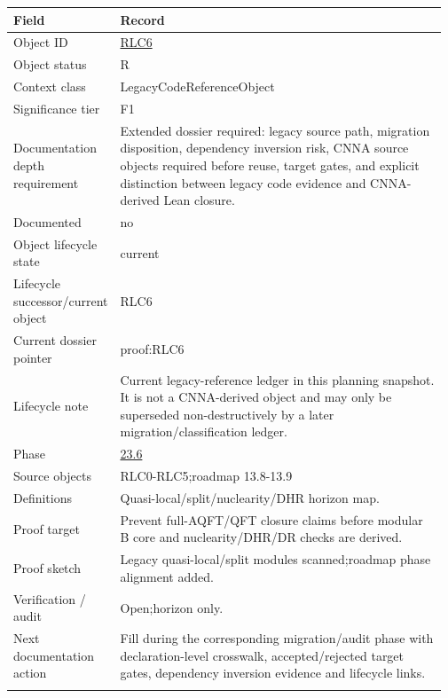 \begin{longtable}{L{0.16\linewidth} L{0.81\linewidth}}
\hline
\textbf{Field} & \textbf{Record}\\
\hline
Object ID & \hyperlink{object-row-RLC6}{RLC6}\\
\hline\addlinespace[0.20em]
Object status & R\\
\hline\addlinespace[0.20em]
Context class & LegacyCodeReferenceObject\\
\hline\addlinespace[0.20em]
Significance tier & F1\\
\hline\addlinespace[0.20em]
Documentation depth requirement & Extended dossier required: legacy source path, migration disposition, dependency inversion risk, CNNA source objects required before reuse, target gates, and explicit distinction between legacy code evidence and CNNA-derived Lean closure.\\
\hline\addlinespace[0.20em]
Documented & no\\
\hline\addlinespace[0.20em]
Object lifecycle state & current\\
\hline\addlinespace[0.20em]
Lifecycle successor/\allowbreak{}current object & RLC6\\
\hline\addlinespace[0.20em]
Current dossier pointer & proof:RLC6\\
\hline\addlinespace[0.20em]
Lifecycle note & Current legacy-reference ledger in this planning snapshot. It is not a CNNA-derived object and may only be superseded non-destructively by a later migration/\allowbreak{}classification ledger.\\
\hline\addlinespace[0.20em]
Phase & \hyperlink{phase-row-23-6}{23.6}\\
\hline\addlinespace[0.20em]
Source objects & RLC0-RLC5;\newline roadmap 13.8-13.9\\
\hline\addlinespace[0.20em]
Definitions & Quasi-local/\allowbreak{}split/\allowbreak{}nuclearity/\allowbreak{}DHR horizon map.\\
\hline\addlinespace[0.20em]
Proof target & Prevent full-AQFT/\allowbreak{}QFT closure claims before modular B core and nuclearity/\allowbreak{}DHR/\allowbreak{}DR checks are derived.\\
\hline\addlinespace[0.20em]
Proof sketch & Legacy quasi-local/\allowbreak{}split modules scanned;\newline roadmap phase alignment added.\\
\hline\addlinespace[0.20em]
Verification /\allowbreak{} audit & Open;\newline horizon only.\\
\hline\addlinespace[0.20em]
Next documentation action & Fill during the corresponding migration/\allowbreak{}audit phase with declaration-level crosswalk, accepted/\allowbreak{}rejected target gates, dependency inversion evidence and lifecycle links.\\
\hline\addlinespace[0.20em]
\end{longtable}

